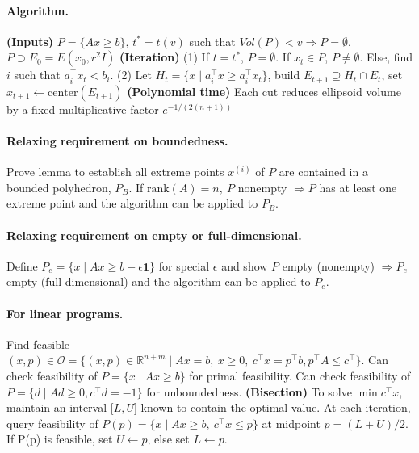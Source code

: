 \documentclass{article}
\begin{document}
\paragraph{Algorithm.} \textbf{(Inputs)} $P=\{Ax \geq b\}$, $t^*=t(v)$ such that $Vol(P) < v \Rightarrow P=\emptyset$, $P \supset E_0 = E(x_0, r^2I)$ \textbf{(Iteration)} (1) If $t=t^*$, $P=\emptyset$. If $x_t\in P$, $P\neq \emptyset$. Else, find $i$ such that $a_i^\top x_t  < b_i$. (2) Let $H_t = \{x \mid a_i^\top x \geq a_i^\top x_t\}$, build $E_{t+1} \supseteq H_t \cap E_t$, set $x_{t+1} \leftarrow \text{center}(E_{t+1})$ \textbf{(Polynomial time)} Each cut reduces ellipsoid volume by a fixed multiplicative factor $e^{-1/(2(n+1))}$

\paragraph{Relaxing requirement on boundedness.} Prove lemma to establish all extreme points $x^{(i)}$ of $P$ are contained in a bounded polyhedron, $P_B$. If $\text{rank}(A)=n,\ P$ nonempty $\Longrightarrow P$ has at least one extreme point and the algorithm can be applied to $P_B$. 

\paragraph{Relaxing requirement on empty or full-dimensional.} Define $P_e = \{x\mid Ax \geq b - \epsilon \mathbf{1}\}$ for special $\epsilon$ and show $P$ empty (nonempty) $\Rightarrow P_e$ empty (full-dimensional) and the algorithm can be applied to $P_e$. 

\paragraph{For linear programs.} Find feasible $(x,p)\in\mathcal O = \{(x,p)\in \mathbb R^{n+m}\mid Ax=b,\ x\geq0,\ c^\top x = p^\top b, p^\top A \leq c^\top\}$. Can check feasibility of $P=\{x\mid Ax\geq b\}$ for primal feasibility. Can check feasibility of $P=\{d\mid Ad\geq 0, c^\top d = -1\}$ for unboundedness. \textbf{(Bisection)} To solve $\min c^\top x$, maintain an interval $[L,U$] known to contain the optimal value. At each iteration, query feasibility of $P(p) = \{x \mid Ax \ge b,\ c^\top x \le p\}$ at midpoint $p=(L+U)/2$. If P(p) is feasible, set $U \leftarrow p$, else set $L \leftarrow p$.
\end{document}
